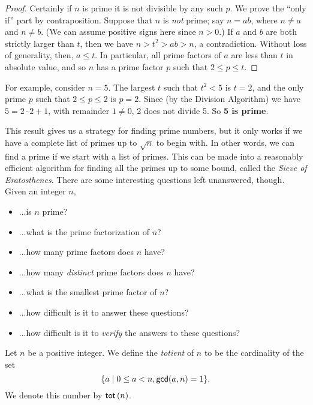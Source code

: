 \begin{proof}
Certainly if \(n\) is prime it is not divisible by any such \(p\).
We prove the ``only if'' part by contraposition.
Suppose that \(n\) is \emph{not} prime; say \(n = ab\), where \(n \neq a\) and \(n \neq b\).
(We can assume positive signs here since \(n > 0\).)
If \(a\) and \(b\) are both strictly larger than \(t\), then we have \(n > t^2 > ab > n\), a contradiction.
Without loss of generality, then, \(a \leq t\).
In particular, all prime factors of \(a\) are less than \(t\) in absolute value, and so \(n\) has a prime factor \(p\) such that \(2 \leq p \leq t\).
\end{proof}

For example, consider \(n = 5\).
The largest \(t\) such that \(t^2 < 5\) is \(t = 2\), and the only prime \(p\) such that \(2 \leq p \leq 2\) is \(p = 2\).
Since (by the Division Algorithm) we have \(5 = 2 \cdot 2 + 1\), with remainder \(1 \neq 0\), 2 does not divide 5.
So \textbf{5 is prime}.

This result gives us a strategy for finding prime numbers, but it only works if we have a complete list of primes up to \(\sqrt{n}\) to begin with.
In other words, we can find a prime if we start with a list of primes.
This can be made into a reasonably efficient algorithm for finding all the primes up to some bound, called the \emph{Sieve of Eratosthenes}.
There are some interesting questions left unanswered, though.
Given an integer \(n\),
\begin{itemize}
\item ...is \(n\) prime?
\item ...what is the prime factorization of \(n\)?
\item ...how many prime factors does \(n\) have?
\item ...how many \emph{distinct} prime factors does \(n\) have?
\item ...what is the smallest prime factor of \(n\)?
\item ...how difficult is it to answer these questions?
\item ...how difficult is it to \emph{verify} the answers to these questions?
\end{itemize}



\Exercises%

\begin{dfn}
Let \(n\) be a positive integer.
We define the \emph{totient} of \(n\) to be the cardinality of the set \[ \{ a \mid 0 \leq a < n, \mathsf{gcd}(a, n) = 1 \}. \]
We denote this number by \(\mathsf{tot}\left(n\right)\).
\end{dfn}
